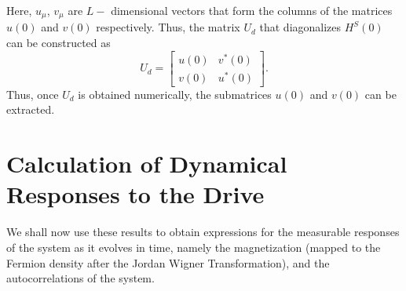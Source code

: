 \documentclass[a4paper,10pt]{article}
\begin{document}
Here, $u_\mu$, $v_\mu$ are $L-$ dimensional vectors that form the columns of the matrices $u(0)$ and $v(0)$ respectively. Thus, the matrix $U_d$ that diagonalizes $H^S (0)$ can be constructed as
\begin{equation}
U_d = \begin{bmatrix}
       u(0) & v^\ast(0)\\
       v(0) & u^\ast(0)
      \end{bmatrix}.
\end{equation}
Thus, once $U_d$ is obtained numerically, the submatrices $u(0)$ and $v(0)$ can be extracted.

\section{Calculation of Dynamical Responses to the Drive}
\label{sec:responses}
We shall now use these results to obtain expressions for the measurable responses of the system as it evolves in time, namely the magnetization (mapped to the Fermion density after the Jordan Wigner Transformation), and the autocorrelations of the system. 
\end{document}
